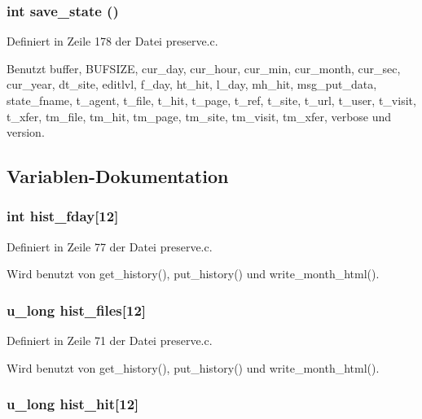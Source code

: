 \subsubsection{\setlength{\rightskip}{0pt plus 5cm}int save\_\-state ()}\label{preserve_8c_30d384683c4584a041792cf314051fa3}




Definiert in Zeile 178 der Datei preserve.c.

Benutzt buffer, BUFSIZE, cur\_\-day, cur\_\-hour, cur\_\-min, cur\_\-month, cur\_\-sec, cur\_\-year, dt\_\-site, editlvl, f\_\-day, ht\_\-hit, l\_\-day, mh\_\-hit, msg\_\-put\_\-data, state\_\-fname, t\_\-agent, t\_\-file, t\_\-hit, t\_\-page, t\_\-ref, t\_\-site, t\_\-url, t\_\-user, t\_\-visit, t\_\-xfer, tm\_\-file, tm\_\-hit, tm\_\-page, tm\_\-site, tm\_\-visit, tm\_\-xfer, verbose und version.

\subsection{Variablen-Dokumentation}
\subsubsection{\setlength{\rightskip}{0pt plus 5cm}int {\bf hist\_\-fday}[12]}\label{preserve_8c_aa2fe5b00c099187be9c1aace6552a9c}




Definiert in Zeile 77 der Datei preserve.c.

Wird benutzt von get\_\-history(), put\_\-history() und write\_\-month\_\-html().
\subsubsection{\setlength{\rightskip}{0pt plus 5cm}u\_\-long {\bf hist\_\-files}[12]}\label{preserve_8c_5fce0b39aa3228d6b471e9294f1fed9d}




Definiert in Zeile 71 der Datei preserve.c.

Wird benutzt von get\_\-history(), put\_\-history() und write\_\-month\_\-html().
\subsubsection{\setlength{\rightskip}{0pt plus 5cm}u\_\-long {\bf hist\_\-hit}[12]}\label{preserve_8c_71b324074ec02105c3730f77c0ab3e50}




